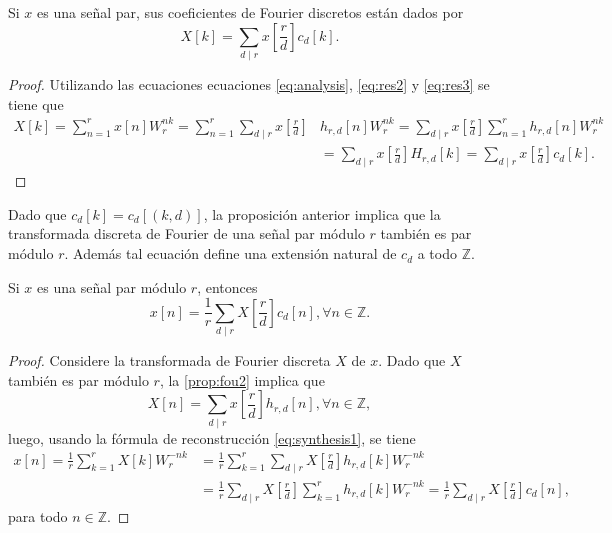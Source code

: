 \begin{proposition}\label{prop:fou4}
Si $x$ es una señal par, sus coeficientes de Fourier discretos están dados por
\begin{equation*}
   X[k] = \sum_{d \mid r} x \left[ \frac{r}{d} \right] c_d[k].
\end{equation*}
\end{proposition}

\begin{proof}
Utilizando las ecuaciones ecuaciones \eqref{eq:analysis}, \eqref{eq:res2} y \eqref{eq:res3} se tiene que
\begin{align*}
    X[k] = \sum_{n=1}^{r} x[n] W_r^{n k} = \sum_{n=1}^{r} \sum_{d \mid r} x \left[ \frac{r}{d} \right] & h_{r,d}[n] W_r^{n k} = \sum_{d \mid r}x \left[ \frac{r}{d} \right] \sum_{n=1}^{r} h_{r,d}[n] W_r^{n k} \\
                                         & = \sum_{d \mid r} x \left[ \frac{r}{d} \right] H_{r,d}[k] = \sum_{d \mid r} x \left[ \frac{r}{d} \right] c_d[k].
\end{align*}
\end{proof}

\thispagestyle{easter2}

\begin{remark}
Dado que $c_d[k] = c_d[(k,d)]$, la proposición anterior implica que la transformada discreta de Fourier de una señal par módulo $r$ también es par módulo $r$. Además tal ecuación define una extensión natural de $c_d$ a todo $\mathbb{Z}$.
\end{remark}

\begin{proposition}
Si $x$ es una señal par módulo $r$, entonces
\begin{equation*}
    x[n] = \frac{1}{r} \sum_{d \mid r} X \left[ \frac{r}{d} \right] c_d[n], \forall n \in \mathbb{Z}.
\end{equation*}
\end{proposition}

\begin{proof}
Considere la transformada de Fourier discreta $X$ de $x$. Dado que $X$ también es par módulo $r$, la \cref{prop:fou2} implica que
\begin{equation*}
    X[n] = \sum_{d \mid r} x \left[ \frac{r}{d} \right] h_{r,d}[n], \forall n \in \mathbb{Z},
\end{equation*}
luego, usando la fórmula de reconstrucción \eqref{eq:synthesis1}, se tiene
\begin{align*}
    x[n] = \frac{1}{r} \sum_{k=1}^{r} X[k] W_r^{-n k} & = \frac{1}{r} \sum_{k=1}^{r} \sum_{d \mid r} X \left[ \frac{r}{d} \right] h_{r,d} [k] W_r^{-n k} \\
         & = \frac{1}{r} \sum_{d \mid r} X \left[ \frac{r}{d} \right] \sum_{k=1}^{r} h_{r,d}[k] W_r^{-n k} = \frac{1}{r} \sum_{d \mid r} X \left[ \frac{r}{d} \right] c_d[n],
\end{align*}
para todo $n \in \mathbb{Z}$.
\end{proof}

